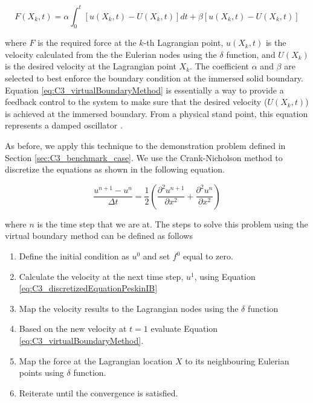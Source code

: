 \begin{equation}\label{eq:C3_virtualBoundaryMethod}
	F(X_k, t) = 
	\alpha \int_0^t \left[ u(X_k, t) - U(X_k, t) \right] dt + 
	\beta \left[ u(X_k, t) - U(X_k, t) \right]
\end{equation}

where $F$ is the required force at the $k$-th Lagrangian point, $u(X_k, t)$ is the velocity calculated from the the Eulerian nodes using the $\delta$ function, and $U(X_k)$ is the desired velocity at the Lagrangian point $X_k$. The coefficient $\alpha$ and $\beta$ are selected to best enforce the boundary condition at the immersed solid boundary. Equation \eqref{eq:C3_virtualBoundaryMethod} is essentially a way to provide a feedback control to the system to make sure that the desired velocity ($U(X_k, t)$) is achieved at the immersed boundary. From a physical stand point, this equation represents a damped oscillator \cite{iaccarino2003immersed}.

As before, we apply this technique to the demonstration problem defined in Section \ref{sec:C3_benchmark_case}. We use the Crank-Nicholson method to discretize the equations as shown in the following equation. 

\begin{equation}\label{eq:C3_virtualBoundaryDiscretization}
	\frac{u^{n+1} - u^n}{\Delta t} = 
	\frac{1}{2}
	\left(
	\frac{\partial^2 u^{n+1}}{\partial x^2} +
	\frac{\partial^2 u^{n}}{\partial x^2}
	\right)
\end{equation}

where $n$ is the time step that we are at. The steps to solve this problem using the virtual boundary method can be defined as follows

\begin{enumerate}
	\item Define the initial condition as $u^0$ and set $f^0$ equal to zero.
	\item Calculate the velocity at the next time step, $u^1$, using Equation \eqref{eq:C3_discretizedEquationPeskinIB}
	\item Map the velocity results to the Lagrangian nodes using the $\delta$ function
	\item Based on the new velocity at $t=1$ evaluate Equation \eqref{eq:C3_virtualBoundaryMethod}.
	\item Map the force at the Lagrangian location $X$ to its neighbouring Eulerian points using $\delta$ function.
	\item Reiterate until the convergence is satisfied.
\end{enumerate}

